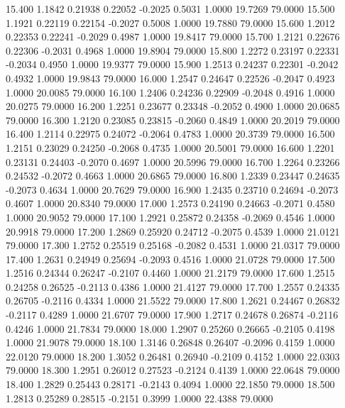   15.400   1.1842   0.21938   0.22052  -0.2025   0.5031   1.0000  19.7269  79.0000
  15.500   1.1921   0.22119   0.22154  -0.2027   0.5008   1.0000  19.7880  79.0000
  15.600   1.2012   0.22353   0.22241  -0.2029   0.4987   1.0000  19.8417  79.0000
  15.700   1.2121   0.22676   0.22306  -0.2031   0.4968   1.0000  19.8904  79.0000
  15.800   1.2272   0.23197   0.22331  -0.2034   0.4950   1.0000  19.9377  79.0000
  15.900   1.2513   0.24237   0.22301  -0.2042   0.4932   1.0000  19.9843  79.0000
  16.000   1.2547   0.24647   0.22526  -0.2047   0.4923   1.0000  20.0085  79.0000
  16.100   1.2406   0.24236   0.22909  -0.2048   0.4916   1.0000  20.0275  79.0000
  16.200   1.2251   0.23677   0.23348  -0.2052   0.4900   1.0000  20.0685  79.0000
  16.300   1.2120   0.23085   0.23815  -0.2060   0.4849   1.0000  20.2019  79.0000
  16.400   1.2114   0.22975   0.24072  -0.2064   0.4783   1.0000  20.3739  79.0000
  16.500   1.2151   0.23029   0.24250  -0.2068   0.4735   1.0000  20.5001  79.0000
  16.600   1.2201   0.23131   0.24403  -0.2070   0.4697   1.0000  20.5996  79.0000
  16.700   1.2264   0.23266   0.24532  -0.2072   0.4663   1.0000  20.6865  79.0000
  16.800   1.2339   0.23447   0.24635  -0.2073   0.4634   1.0000  20.7629  79.0000
  16.900   1.2435   0.23710   0.24694  -0.2073   0.4607   1.0000  20.8340  79.0000
  17.000   1.2573   0.24190   0.24663  -0.2071   0.4580   1.0000  20.9052  79.0000
  17.100   1.2921   0.25872   0.24358  -0.2069   0.4546   1.0000  20.9918  79.0000
  17.200   1.2869   0.25920   0.24712  -0.2075   0.4539   1.0000  21.0121  79.0000
  17.300   1.2752   0.25519   0.25168  -0.2082   0.4531   1.0000  21.0317  79.0000
  17.400   1.2631   0.24949   0.25694  -0.2093   0.4516   1.0000  21.0728  79.0000
  17.500   1.2516   0.24344   0.26247  -0.2107   0.4460   1.0000  21.2179  79.0000
  17.600   1.2515   0.24258   0.26525  -0.2113   0.4386   1.0000  21.4127  79.0000
  17.700   1.2557   0.24335   0.26705  -0.2116   0.4334   1.0000  21.5522  79.0000
  17.800   1.2621   0.24467   0.26832  -0.2117   0.4289   1.0000  21.6707  79.0000
  17.900   1.2717   0.24678   0.26874  -0.2116   0.4246   1.0000  21.7834  79.0000
  18.000   1.2907   0.25260   0.26665  -0.2105   0.4198   1.0000  21.9078  79.0000
  18.100   1.3146   0.26848   0.26407  -0.2096   0.4159   1.0000  22.0120  79.0000
  18.200   1.3052   0.26481   0.26940  -0.2109   0.4152   1.0000  22.0303  79.0000
  18.300   1.2951   0.26012   0.27523  -0.2124   0.4139   1.0000  22.0648  79.0000
  18.400   1.2829   0.25443   0.28171  -0.2143   0.4094   1.0000  22.1850  79.0000
  18.500   1.2813   0.25289   0.28515  -0.2151   0.3999   1.0000  22.4388  79.0000
